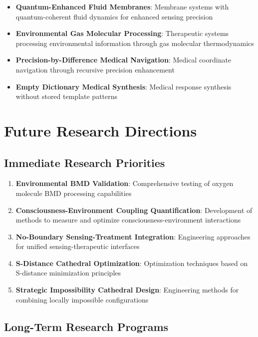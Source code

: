 \documentclass[12pt,a4paper]{article}
\begin{document}
\begin{itemize}
\item \textbf{Quantum-Enhanced Fluid Membranes}: Membrane systems with quantum-coherent fluid dynamics for enhanced sensing precision
\item \textbf{Environmental Gas Molecular Processing}: Therapeutic systems processing environmental information through gas molecular thermodynamics
\item \textbf{Precision-by-Difference Medical Navigation}: Medical coordinate navigation through recursive precision enhancement
\item \textbf{Empty Dictionary Medical Synthesis}: Medical response synthesis without stored template patterns
\end{itemize}

\section{Future Research Directions}

\subsection{Immediate Research Priorities}

\begin{enumerate}
\item \textbf{Environmental BMD Validation}: Comprehensive testing of oxygen molecule BMD processing capabilities
\item \textbf{Consciousness-Environment Coupling Quantification}: Development of methods to measure and optimize consciousness-environment interactions
\item \textbf{No-Boundary Sensing-Treatment Integration}: Engineering approaches for unified sensing-therapeutic interfaces
\item \textbf{S-Distance Cathedral Optimization}: Optimization techniques based on S-distance minimization principles
\item \textbf{Strategic Impossibility Cathedral Design}: Engineering methods for combining locally impossible configurations
\end{enumerate}

\subsection{Long-Term Research Programs}
\end{document}
